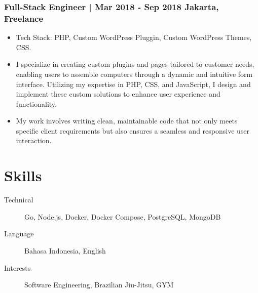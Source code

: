 \documentclass[11pt]{article}
\begin{document}
\subsubsection{Full-Stack Engineer | Mar 2018 - Sep 2018 \hfill Jakarta, Freelance}
\begin{itemize}
    \item Tech Stack: PHP, Custom WordPress Pluggin, Custom WordPress Themes, CSS.
    \item I specialize in creating custom plugins and pages tailored to customer needs, enabling users to assemble computers through a dynamic and intuitive form interface. Utilizing my expertise in PHP, CSS, and JavaScript, I design and implement these custom solutions to enhance user experience and functionality.
    \item My work involves writing clean, maintainable code that not only meets specific client requirements but also ensures a seamless and responsive user interaction.
\end{itemize}


\section{Skills}
\begin{description}
    \item[Technical] Go, Node.js, Docker, Docker Compose, PostgreSQL, MongoDB
    \item[Language] Bahasa Indonesia, English
    \item[Interests] Software Engineering, Brazilian Jiu-Jitsu, GYM
\end{description}
\end{document}
